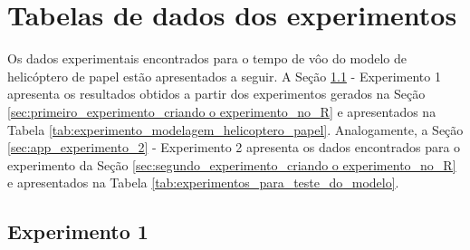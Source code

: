 \chapter{Tabelas de dados dos experimentos}
\label{chap:app_tabelas_de_dados_dos_experimentos}

Os dados experimentais encontrados para o tempo de vôo do modelo de helicóptero de papel estão apresentados a seguir. A Seção \ref{sec:app_experimento_1} - Experimento 1 apresenta os resultados obtidos a partir dos experimentos gerados na Seção \ref{sec:primeiro_experimento_criando o experimento_no_R} e apresentados na Tabela \ref{tab:experimento_modelagem_helicoptero_papel}. Analogamente, a Seção \ref{sec:app_experimento_2} - Experimento 2 apresenta os dados encontrados para o experimento da Seção \ref{sec:segundo_experimento_criando o experimento_no_R} e apresentados na Tabela \ref{tab:experimentos_para_teste_do_modelo}.

\section{Experimento 1}
\label{sec:app_experimento_1}

\begin{table}[H]
  \caption{Dados experimentais para modelagem.}
  \label{tab:dados_experimentais_para_modelagem}
\end{table}

